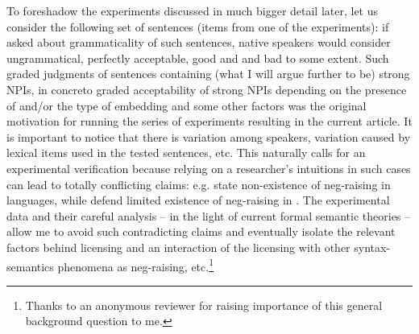 \documentclass[output=paper, colorlinks, citecolor=brown, newtxmath]{langsci/langscibook}
\begin{document}
To foreshadow the experiments discussed in much bigger detail later, let us consider the following set of  sentences (items from one of the experiments): if asked about grammaticality of such sentences,  native speakers would consider  ungrammatical,  perfectly acceptable,  good and  and  bad to some extent. Such graded judgments of sentences containing (what I will argue further to be) strong NPIs, in concreto graded acceptability of strong NPIs depending on the presence of  and/or the type of embedding  and some other factors was the original motivation for running the series of experiments resulting in the current article. It is important to notice that there is variation among speakers, variation caused by lexical items used in the tested sentences, etc. This naturally calls for an experimental verification because relying on a researcher's intuitions in such cases can lead to totally conflicting claims: e.g. \cite{Boskovic2011} state non-existence of neg-raising in  languages, while \cite{dovcekal2016experimentala} defend limited existence of neg-raising in . The experimental data and their careful analysis -- in the light of current formal semantic theories -- allow me to avoid such contradicting claims and eventually isolate the relevant factors behind  licensing and an interaction of the licensing with other syntax-semantics phenomena as neg-raising, etc.\footnote{Thanks to an anonymous reviewer for raising importance of this general background question to me.}

\ea \label{ex-2-5} 

\z
\z
\end{document}

